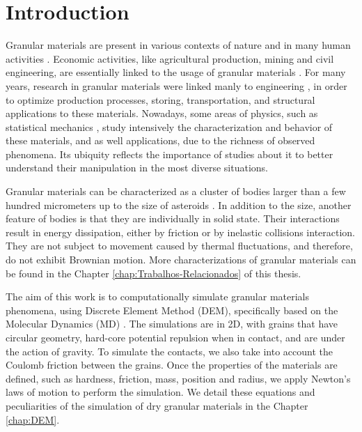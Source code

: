 
\chapter{Introduction}
\label{chap:Introducao}
    Granular materials are present in various contexts of nature and in many human activities \cite{Granular_Media_Between_Fluid_and_Solid, Sands_Powders_and_Grains, The_Physics_of_Granular_Media, Granular_Physics, Micromechanics_of_Granular_Materials}. Economic activities, like agricultural production, mining and civil engineering, are essentially linked to the usage of granular materials \cite{Sands_Powders_and_Grains}. For many years, research in granular materials were linked manly to engineering \cite{Abraao-Dissertacao, Versuche_uber_Getreidedruck_in_Silozellen, Janssen}, in order to optimize production processes, storing, transportation, and structural applications to these materials. Nowadays, some areas of physics, such as statistical mechanics \cite{Unifying_Concepts_in_Granular_Media_and_Glasses}, study intensively the characterization and behavior of these materials, and as well applications, due to the richness of observed phenomena. Its ubiquity reflects the importance of studies about it to better understand their manipulation in the most diverse situations.

    Granular materials can be characterized as a cluster of bodies larger than a few hundred micrometers up to the size of asteroids \cite{Sands_Powders_and_Grains, The_Physics_of_Granular_Media}. In addition to the size, another feature of bodies is that they are individually in solid state. Their interactions result in energy dissipation, either by friction or by inelastic collisions interaction. They are not subject to movement caused by thermal fluctuations, and therefore, do not exhibit Brownian motion. More characterizations of granular materials can be found in the Chapter \ref{chap:Trabalhos-Relacionados} of this thesis.

    The aim of this work is to computationally simulate granular materials phenomena, using Discrete Element Method (DEM), specifically based on the Molecular Dynamics (MD) \cite{Computer_Simulation_of_Liquids}. The simulations are in 2D, with grains that have circular geometry, hard-core potential repulsion when in contact, and are under the action of gravity. To simulate the contacts, we also take into account the Coulomb friction between the grains. Once the properties of the materials are defined, such as hardness, friction, mass, position and radius, we apply Newton's laws of motion to perform the simulation. We detail these equations and peculiarities of the simulation of dry granular materials in the Chapter \ref{chap:DEM}.

